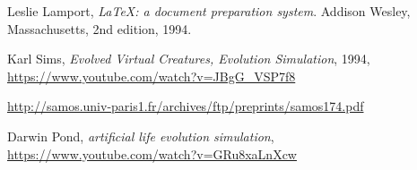 \begin{thebibliography}{99}


  Leslie Lamport,
  \emph{\LaTeX: a document preparation system}.
  Addison Wesley, Massachusetts,
  2nd edition,
  1994.

Karl Sims,
 \emph{Evolved Virtual Creatures, Evolution Simulation}, 1994,
 \url{https://www.youtube.com/watch?v=JBgG\_VSP7f8}

 \url{http://samos.univ-paris1.fr/archives/ftp/preprints/samos174.pdf}

Darwin Pond,
 \emph{artificial life evolution simulation},
 \url{https://www.youtube.com/watch?v=GRu8xaLnXcw}



\end{thebibliography}
